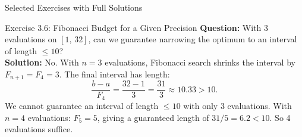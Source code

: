 \documentclass[aspectratio=169,10pt]{beamer}
\begin{document}
\begin{frame}[allowframebreaks]{Selected Exercises with Full Solutions}
  \begin{block}{Exercise 3.6: Fibonacci Budget for a Given Precision}
    \textbf{Question:} With 3 evaluations on $[1,\, 32]$, can we guarantee
    narrowing the optimum to an interval of length $\le 10$?\\[6pt]
    \textbf{Solution:} No.  With $n = 3$ evaluations, Fibonacci search
    shrinks the interval by $F_{n+1} = F_4 = 3$.  The final interval
    has length:
    \[
      \frac{b - a}{F_4} = \frac{32 - 1}{3} = \frac{31}{3} \approx 10.33 > 10.
    \]
    We cannot guarantee an interval of length $\le 10$ with only 3 evaluations.
    With $n = 4$ evaluations: $F_5 = 5$, giving a guaranteed length of
    $31/5 = 6.2 < 10$.  So 4 evaluations suffice.
  \end{block}

\end{frame}
\end{document}
